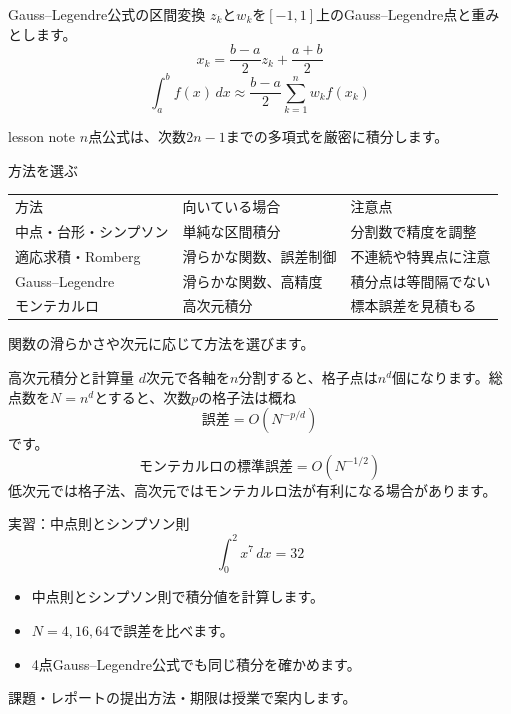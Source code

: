 \documentclass[12pt,aspectratio=43]{beamer}
\newenvironment{lessonbox}
  {\begin{beamercolorbox}[wd=\linewidth,sep=1.5mm]{lesson note}}
  {\end{beamercolorbox}\par}
\begin{document}
\begin{frame}[t]{Gauss--Legendre公式の区間変換}
  $z_k$と$w_k$を$[-1,1]$上のGauss--Legendre点と重みとします。
  \[
    x_k=\frac{b-a}{2}z_k+\frac{a+b}{2}
  \]
  \[
    \int_a^b f(x)\,dx\approx\frac{b-a}{2}\sum_{k=1}^{n}w_k f(x_k)
  \]
  \begin{lessonbox}
    $n$点公式は、次数$2n-1$までの多項式を厳密に積分します。
  \end{lessonbox}
\end{frame}

\begin{frame}[t]{方法を選ぶ}
  \small
  \begingroup\centering
    \renewcommand{\arraystretch}{1.5}
    \begin{tabular}{p{.23\linewidth}p{.31\linewidth}p{.29\linewidth}}
      方法 & 向いている場合 & 注意点 \\
      中点・台形・シンプソン & 単純な区間積分 & 分割数で精度を調整 \\
      適応求積・Romberg & 滑らかな関数、誤差制御 & 不連続や特異点に注意 \\
      Gauss--Legendre & 滑らかな関数、高精度 & 積分点は等間隔でない \\
      モンテカルロ & 高次元積分 & 標本誤差を見積もる
    \end{tabular}\par
  \endgroup
  \vspace{2mm}
  関数の滑らかさや次元に応じて方法を選びます。
\end{frame}

\begin{frame}[t]{高次元積分と計算量}
  $d$次元で各軸を$n$分割すると、格子点は$n^d$個になります。総点数を$N=n^d$とすると、次数$p$の格子法は概ね
  \[
    \text{誤差}=O(N^{-p/d})
  \]
  です。
  \[
    \text{モンテカルロの標準誤差}=O(N^{-1/2})
  \]
  \small 低次元では格子法、高次元ではモンテカルロ法が有利になる場合があります。
\end{frame}

\begin{frame}[t]{実習：中点則とシンプソン則}
  \[
    \int_0^2 x^7\,dx=32
  \]
  \begin{itemize}
    \setlength{\itemsep}{3mm}
    \item 中点則とシンプソン則で積分値を計算します。
    \item $N=4,16,64$で誤差を比べます。
    \item 4点Gauss--Legendre公式でも同じ積分を確かめます。
  \end{itemize}
  \vfill
  課題・レポートの提出方法・期限は授業で案内します。
\end{frame}
\end{document}
